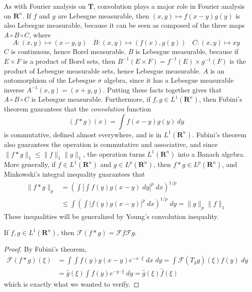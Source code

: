 As with Fourier analysis on $\mathbf{T}$, convolution plays a major role in Fourier analysis on $\mathbf{R}^n$.
%
%
If $f$ and $g$ are Lebesgue measurable, then $(x,y) \mapsto f(x - y)g(y)$ is also Lebesgue measurable, because it can be seen as composed of the three maps $A \circ B \circ C$, where
%
\[ A: (x,y) \mapsto (x-y,y)\ \ \ \ B: (x,y) \mapsto (f(x),g(y))\ \ \ \ C: (x,y) \mapsto xy \]
%
$C$ is continuous, hence Borel measurable. $B$ is Lebesgue measurable, because if $E \times F$ is a product of Borel sets, then $B^{-1}(E \times F) = f^{-1}(E) \times g^{-1}(F)$ is the product of Lebesgue measurable sets, hence Lebesgue measurable. $A$ is an automorphism of the Lebesgue $\sigma$ algebra, since it has a Lebesgue measurable inverse $A^{-1}(x,y) = (x+y,y)$. Putting these facts together gives that $A \circ B \circ C$ is Lebesgue measurable. Furthermore, if $f,g \in L^1(\mathbf{R}^n)$, then Fubini's theorem guarantees that the {\it convolution} function
%
\[ (f * g)(x) = \int f(x-y)g(y)\ dy \]
%
is commutative, defined almost everywhere, and is in $L^1(\mathbf{R}^n)$. Fubini's theorem also guarantees the operation is commutative and associative, and since $\| f * g \|_1 \leq \| f \|_1 \| g \|_1$, the operation turns $L^1(\mathbf{R}^n)$ into a Banach algebra. More generally, if $f \in L^1(\mathbf{R}^n)$ and $g \in L^p(\mathbf{R}^n)$, then $f * g \in L^p(\mathbf{R}^n)$, and Minkowski's integral inequality guarantees that
%
\begin{align*}
	\| f * g \|_p &= \left( \int \left| \int f(y)g(x-y)\; dy \right|^p\; dx \right)^{1/p}\\
	&\leq \int \left( \int |f(y) g(x-y)|^p\; dx \right)^{1/p}\; dy = \|g\|_p \| f \|_1
\end{align*}
%
These inequalities will be generalized by Young's convolution inequality.

\begin{theorem}
	If $f,g \in L^1(\mathbf{R}^n)$, then $\mathcal{F}(f * g) = \mathcal{F}f \mathcal{F}g$.
\end{theorem}
\begin{proof}
	By Fubini's theorem,
	\begin{align*}
		\mathcal{F}(f * g)(\xi) &= \int \int f(y)g(x-y) e^{-x \cdot \xi}\; dx\; dy = \int \mathcal{F}(T_y g)(\xi) f(y)\; dy\\
		&= \widehat{g}(\xi) \int f(y) e^{-y \cdot \xi}\; dy = \widehat{g}(\xi) \widehat{f}(\xi)
	\end{align*}
	which is exactly what we wanted to verify.
\end{proof}

